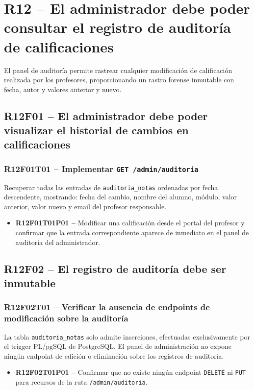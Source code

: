 \documentclass[12pt, a4paper]{report}
\begin{document}
\section{R12 -- El administrador debe poder consultar el registro de auditoría de calificaciones}

El panel de auditoría permite rastrear cualquier modificación de calificación realizada por los profesores, proporcionando un rastro forense inmutable con fecha, autor y valores anterior y nuevo.

\subsection{R12F01 -- El administrador debe poder visualizar el historial de cambios en calificaciones}

\subsubsection{R12F01T01 -- Implementar \texttt{GET /admin/auditoria}}
Recuperar todas las entradas de \texttt{auditoria\_notas} ordenadas por fecha descendente, mostrando: fecha del cambio, nombre del alumno, módulo, valor anterior, valor nuevo y email del profesor responsable.
\begin{itemize}
  \item \textbf{R12F01T01P01 --} Modificar una calificación desde el portal del profesor y confirmar que la entrada correspondiente aparece de inmediato en el panel de auditoría del administrador.
\end{itemize}

\subsection{R12F02 -- El registro de auditoría debe ser inmutable}

\subsubsection{R12F02T01 -- Verificar la ausencia de endpoints de modificación sobre la auditoría}
La tabla \texttt{auditoria\_notas} solo admite inserciones, efectuadas exclusivamente por el trigger PL/pgSQL de PostgreSQL. El panel de administración no expone ningún endpoint de edición o eliminación sobre los registros de auditoría.
\begin{itemize}
  \item \textbf{R12F02T01P01 --} Confirmar que no existe ningún endpoint \texttt{DELETE} ni \texttt{PUT} para recursos de la ruta \texttt{/admin/auditoria}.
\end{itemize}
\end{document}
